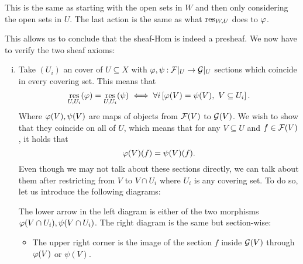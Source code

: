 \documentclass[12pt]{memoir}
\begin{document}
\begin{ptcbr}
\begin{enumerate}[i)]
        This is the same as starting with the open sets in $W$ and then only considering the open sets in $U$. The last action is the same as what $\operatorname*{res}_{W,U}$ does to $\varphi$.
    \end{enumerate}
    This allows us to conclude that the sheaf-Hom is indeed a presheaf. We now have to verify the two sheaf axioms:
    \begin{enumerate}[i)]
        \itemsep=-0.4em
        \item Take $(U_i)$ an cover of $U\subseteq X$ with $\varphi,\psi\mathbin{:}\mathcal{F}|_U\to\mathcal{G}|_U$ sections which coincide in every covering set. This means that 
        $$\operatorname*{res}_{U,U_i}(\varphi)=\operatorname*{res}_{U,U_i}(\psi)\iff\forall i\left\lbrack\varphi(V)=\psi(V),\ V\subseteq U_i\right\rbrack.$$
        Where $\varphi(V),\psi(V)$ are maps of objects from $\mathcal{F}(V)$ to $\mathcal{G}(V)$. We wish to show that they coincide on all of $U$, which means that for any $V\subseteq U$ and $f\in\mathcal{F}(V)$, it holds that
        $$\varphi(V)(f)=\psi(V)(f).$$
        Even though we may not talk about these sections directly, we can talk about them after restricting from $V$ to $V\cap U_i$ where $U_i$ is any covering set. To do so, let us introduce the following diagrams:
        \begin{center}
        \end{center}
The lower arrow in the left diagram is either of the two morphisms $\varphi(V\cap U_i),\psi(V\cap U_i)$. The right diagram is the same but section-wise:
\begin{itemize}
    \itemsep=-0.4em
    \item The upper right corner is the image of the section $f$ inside $\mathcal{G}(V)$ through $\varphi(V)$ or $\psi(V)$.

\end{itemize}
\end{enumerate}
\end{ptcbr}
\end{document}
